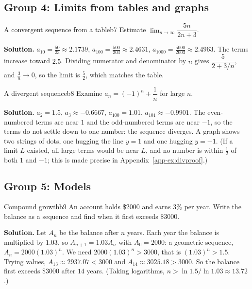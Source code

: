 \documentclass[11pt]{article}
\begin{document}
\subsection*{Group 4: Limits from tables and graphs}

\begin{exmp}{A convergent sequence from a table}{b7}
Estimate $\lim_{n\to\infty}\dfrac{5n}{2n+3}$.

\textbf{Solution.} $a_{10}=\frac{50}{23}\approx2.1739$, $a_{100}=\frac{500}{203}\approx2.4631$, $a_{1000}=\frac{5000}{2003}\approx2.4963$. The terms increase toward $2.5$. Dividing numerator and denominator by $n$ gives $\dfrac{5}{2+3/n}$, and $\frac3n\to0$, so the limit is $\frac52$, which matches the table.
\end{exmp}

\begin{exmp}{A divergent sequence}{b8}
Examine $a_n=(-1)^n+\dfrac1n$ for large $n$.

\textbf{Solution.} $a_2=1.5$, $a_3\approx-0.6667$, $a_{100}=1.01$, $a_{101}\approx-0.9901$. The even-numbered terms are near $1$ and the odd-numbered terms are near $-1$, so the terms do not settle down to one number: the sequence diverges. A graph shows two strings of dots, one hugging the line $y=1$ and one hugging $y=-1$. (If a limit $L$ existed, all large terms would be near $L$, and no number is within $\frac12$ of both $1$ and $-1$; this is made precise in Appendix~\ref{app-ex:divproof}.)
\end{exmp}

\subsection*{Group 5: Models}

\begin{exmp}{Compound growth}{b9}
An account holds \$2000 and earns $3\%$ per year. Write the balance as a sequence and find when it first exceeds \$3000.

\textbf{Solution.} Let $A_n$ be the balance after $n$ years. Each year the balance is multiplied by $1.03$, so $A_{n+1}=1.03A_n$ with $A_0=2000$: a geometric sequence, $A_n=2000(1.03)^n$. We need $2000(1.03)^n>3000$, that is $(1.03)^n>1.5$. Trying values, $A_{13}\approx2937.07<3000$ and $A_{14}\approx3025.18>3000$. So the balance first exceeds \$3000 after $14$ years. (Taking logarithms, $n>\ln1.5/\ln1.03\approx13.72$.)
\end{exmp}
\end{document}
